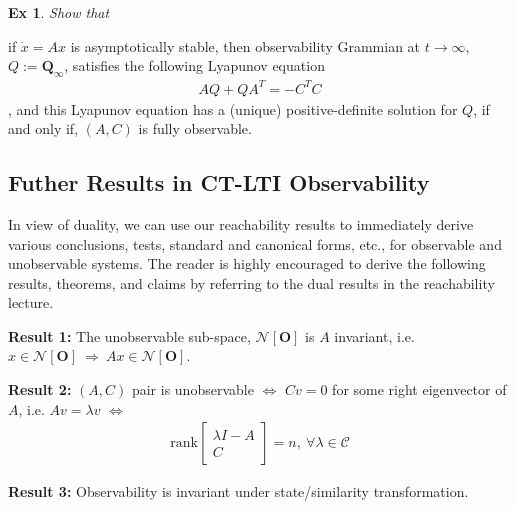 \documentclass[twoside]{article}
\newtheorem{exmp}[theorem]{Ex}
\begin{document}
\begin{exmp}
Show that
\end{exmp}
if $\dot{x} = A x$ is asymptotically stable, then observability Grammian at $t \to \infty$, $Q := \mathbf{Q}_{\infty}$,
satisfies the following Lyapunov equation
%
\begin{align*}
    A Q + Q A^T = - C^T C
\end{align*}
% 
, and this Lyapunov equation has a (unique) positive-definite solution for $Q$,
if and only if, $(A,C)$ is fully observable.

\subsection{Futher Results in CT-LTI Observability}

In view of duality, we can use our reachability results to immediately derive various conclusions, tests,
standard and canonical forms, etc., for observable and unobservable systems. The reader is highly encouraged to 
derive the following results, theorems, and claims by referring to the dual results in the reachability lecture.

\textbf{Result 1:} The unobservable sub-space, $\mathcal{N} [\mathbf{O}] $ is $A$ invariant, i.e. $x\in \mathcal{N} [\mathbf{O}]  \ \Rightarrow \ A x \in \mathcal{N} [\mathbf{O}] $. 

\textbf{Result 2:} $(A,C)$ pair is unobservable $\iff$ $C v = 0$ for some right eigenvector of $A$, i.e. $A v = \lambda v$ $\iff$
\begin{align*}
\mathrm{rank} \left[ \begin{array}{c} \lambda I - A \\ \hline C \end{array} \right] = n , \ \forall \lambda \in \mathcal{C}
\end{align*}

\textbf{Result 3:} Observability is invariant under state/similarity transformation. 

\end{document}
